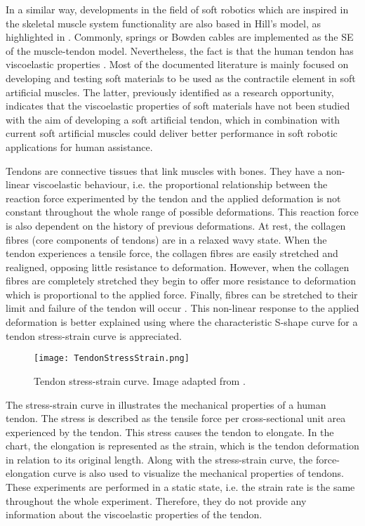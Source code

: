 In a similar way, developments in the field of soft robotics which are inspired in the skeletal muscle system functionality are also based in Hill's model, as highlighted in . Commonly, springs \cite{park2011bio} or Bowden cables \cite{Zhang2013a} are implemented as the SE of the muscle-tendon model. Nevertheless, the fact is that the human tendon has viscoelastic properties \cite{maurel1998biomechanical}. Most of the documented literature is mainly focused on developing and testing soft materials to be used as the contractile element in soft artificial muscles. The latter, previously identified as a research opportunity, indicates that the viscoelastic properties of soft materials have not been studied with the aim of developing a soft artificial tendon, which in combination with current soft artificial muscles could deliver better performance in soft robotic applications for human assistance.

Tendons are connective tissues that link muscles with bones. They have a non-linear viscoelastic behaviour, i.e. the proportional relationship between the reaction force experimented by the tendon and the applied deformation is not constant throughout the whole range of possible deformations. This reaction force is also dependent on the history of previous deformations. At rest, the collagen fibres (core components of tendons) are in a relaxed wavy state. When the tendon experiences a tensile force, the collagen fibres are easily stretched and realigned, opposing little resistance to deformation. However, when the collagen fibres are completely stretched they begin to offer more resistance to deformation which is proportional to the applied force. Finally, fibres can be stretched to their limit and failure of the tendon will occur \cite{nordin2001basic}. This non-linear response to the applied deformation is better explained using  where the characteristic S-shape curve for a tendon stress-strain curve is appreciated.

\begin{figure}[htb!]
	\centering
	\texttt{[image: TendonStressStrain.png]}
	\caption[Tendon stress-strain curve.]{Tendon stress-strain curve. Image adapted from \cite{maurel1998biomechanical}. }
	\label{fig:tendonSS}
\end{figure}

The stress-strain curve in  illustrates the mechanical properties of a human tendon. The stress is described as the tensile force per cross-sectional unit area experienced by the tendon. This stress causes the tendon to elongate. In the chart, the elongation is represented as the strain, which is the tendon deformation in relation to its original length. Along with the stress-strain curve, the force-elongation curve is also used to visualize the mechanical properties of tendons. These experiments are performed in a static state, i.e. the strain rate is the same throughout the whole experiment. Therefore, they do not provide any information about the viscoelastic properties of the tendon.

